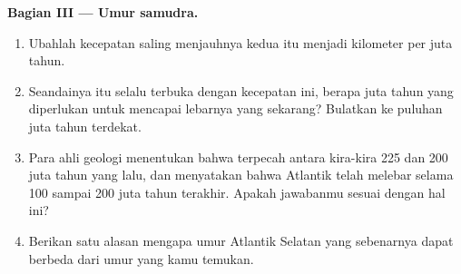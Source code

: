 \begin{problem}
\medskip
\noindent\textbf{Bagian III --- Umur samudra.}
\begin{enumerate}[resume]
  \item Ubahlah kecepatan saling menjauhnya kedua  itu menjadi
        kilometer per juta tahun.
  \item Seandainya  itu selalu terbuka dengan kecepatan ini, berapa
        juta tahun yang diperlukan untuk mencapai lebarnya yang sekarang?
        Bulatkan ke puluhan juta tahun terdekat.
  \item Para ahli geologi menentukan bahwa  terpecah antara kira-kira
        225 dan 200 juta tahun yang lalu, dan menyatakan bahwa Atlantik telah
        melebar selama 100 sampai 200 juta tahun terakhir. Apakah jawabanmu
        sesuai dengan hal ini?
  \item Berikan satu alasan mengapa umur Atlantik Selatan yang sebenarnya
        dapat berbeda dari umur yang kamu temukan.
\end{enumerate}
\end{problem}
